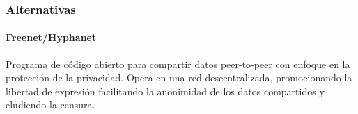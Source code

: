

\subsubsection{Alternativas}
\paragraph{Freenet/Hyphanet}
Programa de código abierto para compartir datos peer-to-peer con enfoque en la protección de la privacidad. Opera en una red descentralizada, promocionando la libertad de expresión facilitando la anonimidad de los datos compartidos y eludiendo la censura.\cite{freenet}\cite{hyphanet}

